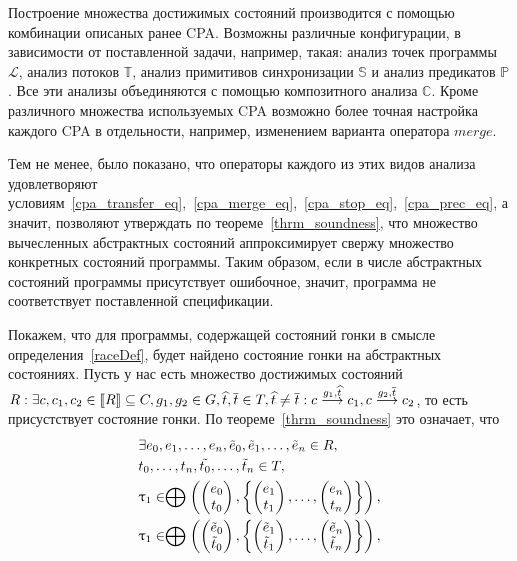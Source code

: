 Построение множества достижимых состояний производится с помощью комбинации описаных ранее CPA.
Возможны различные конфигурации, в зависимости от поставленной задачи, например, такая: анализ точек программы $\mathcal{L}$, анализ потоков $\mathbb{T}$, анализ примитивов синхронизации $\mathbb{S}$ и анализ предикатов $\mathbb{P}$. Все эти анализы объединяются с помощью композитного анализа $\mathbb{C}$. Кроме различного множества используемых CPA возможно более точная настройка каждого CPA в отдельности, например, изменением варианта оператора $merge$.

Тем не менее, было показано, что операторы каждого из этих видов анализа удовлетворяют условиям~\ref{cpa_transfer_eq},~\ref{cpa_merge_eq},~\ref{cpa_stop_eq},~\ref{cpa_prec_eq}, а значит, позволяют утверждать по теореме~\ref{thrm_soundness}, что множество вычесленных абстрактных состояний аппроксимирует свержу множество конкретных состояний программы.
Таким образом, если в числе абстрактных состояний программы присутствует ошибочное, значит, программа не соответствует поставленной спецификации.

Покажем, что для программы, содержащей состояний гонки в смысле определения~\ref{raceDef}, будет найдено состояние гонки на абстрактных состояниях.
Пусть у нас есть множество достижимых состояний $R: \exists c, c_1, c_2 \in [\![ R ]\!] \subseteq C, g_1, g_2 \in G, \widehat{t}, \overline{t} \in T, \widehat{t} \neq \overline{t}: c \stackrel{g_1, \widehat{t}}{\longrightarrow} c_1, c \stackrel{g_2, \overline{t}}{\longrightarrow} c_2$, то есть присустствует состояние гонки.
По теореме~\ref{thrm_soundness} это означает, что 
\begin{align*}
& \exists e_0, e_1, \dots, e_n, \tilde{e}_0, \tilde{e}_1, \dots, \tilde{e}_n \in R, \\
& t_0, \dots, t_n, \tilde{t_0}, \dots, \tilde{t}_n \in T, \\
& \uptau_1 \in \mathrel{\bigoplus}
\left(
\begin{pmatrix}
e_0 \\
t_0 
\end{pmatrix},
\left\{
\begin{pmatrix}
e_1 \\
t_1 
\end{pmatrix},
\dots ,
\begin{pmatrix}
e_n \\
t_n 
\end{pmatrix}
\right\}
\right), \\
& \uptau_1 \in \mathrel{\bigoplus}
\left(
\begin{pmatrix}
\tilde{e}_0 \\
\tilde{t}_0 
\end{pmatrix},
\left\{
\begin{pmatrix}
\tilde{e}_1 \\
\tilde{t}_1 
\end{pmatrix},
\dots ,
\begin{pmatrix}
\tilde{e}_n \\
\tilde{t}_n 
\end{pmatrix}
\right\}
\right), \\
\end{align*}

